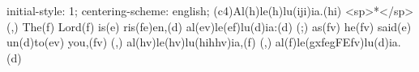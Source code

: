 initial-style: 1;
centering-scheme: english;
(c4)Al(h)le(h)lu(iji)ia.(hi) <sp>*</sp>(,) The(f) Lord(f) is(e) ris(fe)en,(d) al(ev)le(ef)lu(d)ia:(d) (;) as(fv) he(fv) said(e) un(d)to(ev) you,(fv) (,) al(hv)le(hv)lu(hihhv)ia,(f) (,) al(f)le(gxfegFEfv)lu(d)ia.(d)
